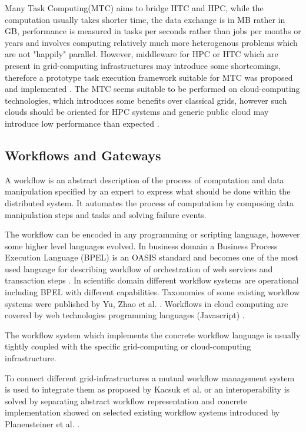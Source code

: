 Many Task Computing(MTC) aims to bridge HTC and HPC, while the computation usually takes shorter time, the data exchange is in MB rather in GB, performance is measured in tasks per seconds rather than jobs per months or years and involves computing relatively much more heterogenous problems which are not "happily" parallel. However, middleware for HPC or HTC which are present in grid-computing infrastructures may introduce some shortcomings, therefore a prototype task execution framework suitable for MTC was proposed and implemented \cite{Raicu2008, Raicu2009,Raicu2010}.
The MTC seems suitable to be performed on cloud-computing technologies, which introduces some benefits over classical grids, however such clouds should be oriented for HPC systems and generic public cloud may introduce low performance than expected \cite{Iosup2010}.

\subsection{Workflows and Gateways}
\label{sec:introworkflow}
A workflow is an abstract description of the process of computation and data manipulation specified by an expert to express what should be done within the distributed system. It automates the process of computation by composing data manipulation steps and tasks and solving failure events.

The workflow can be encoded in any programming or scripting language, however some higher level languages evolved. In business domain a Business Process Execution Language (BPEL) is an OASIS standard and becomes one of the most used language for describing workflow of orchestration of web services and transaction steps \cite{Pasley2005}. In scientific domain different workflow systems are operational including BPEL with different capabilities. Taxonomies of some existing workflow systems were published by Yu, Zhao et al. \cite{Yu2005a,Zhao2008,Curcin2008}. Workflows in cloud computing are covered by web technologies programming languages (Javascript) \cite{Foster2008}.

The workflow system which implements the concrete workflow language is usually tightly coupled with the specific grid-computing or cloud-computing infrastructure. 

To connect different grid-infrastructures a mutual workflow management system is used to integrate them as proposed by Kacsuk et al. \cite{Kacsuk2008a,Kacsuk2011} or an interoperability is solved by separating abstract workflow representation and concrete implementation showed on selected existing workflow systems introduced by Planensteiner et al. \cite{Plankensteiner2013}.

